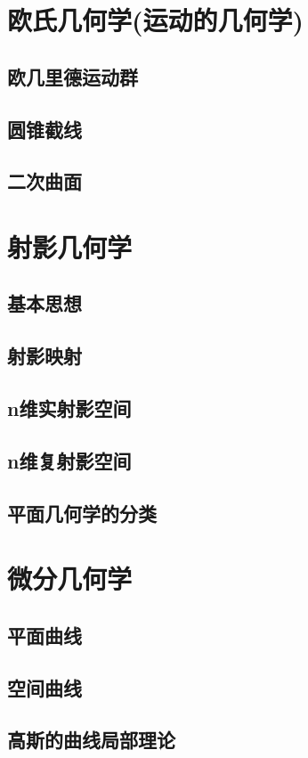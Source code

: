 \chapter{欧氏几何学(运动的几何学)}
\section{欧几里德运动群}
\section{圆锥截线}
\section{二次曲面}

\chapter{射影几何学}
\section{基本思想}
\section{射影映射}
\section{n维实射影空间}
\section{n维复射影空间}
\section{平面几何学的分类}

\chapter{微分几何学}
\section{平面曲线}
\section{空间曲线}
\section{高斯的曲线局部理论}
